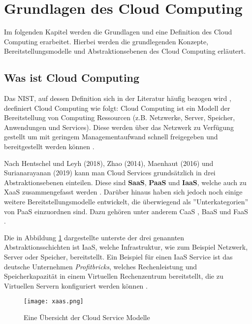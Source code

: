 \section{Grundlagen des Cloud Computing}
\label{sec:cloud-computing}

Im folgenden Kapitel werden die Grundlagen und eine Definition des Cloud Computing erarbeitet. Hierbei werden die grundlegenden Konzepte, Bereitstellungsmodelle und Abstraktionsebenen des Cloud Computing erläutert.

\subsection{Was ist Cloud Computing}
Das \ac{NIST}, auf dessen Definition sich in der Literatur häufig bezogen wird \cite[Vgl.][S. 4f]{Reinheimer2018}, deefiniert Cloud Computing wie folgt: Cloud Computing ist ein Modell der Bereitstellung von Computing Ressourcen (z.B. Netzwerke, Server, Speicher, Anwendungen und Services). Diese werden über das Netzwerk zu Verfügung gestellt um mit geringem Managementaufwand schnell freigegeben und bereitgestellt werden können \cite[Vgl.][S. 2]{Mell2011}\cite[Vgl.][S. 5]{Reinheimer2018}.

Nach Hentschel und Leyh (2018), Zhao (2014), Maenhaut (2016) und Surianarayanan (2019) kann man Cloud Services grundsätzlich in drei Abstraktionsebenen einteilen. Diese sind \textbf{\ac{SaaS}}, \textbf{\ac{PaaS}} und \textbf{\ac{IaaS}}, welche auch zu \ac{XaaS} zusammengefasst werden \cite[Vgl.][S. 9]{Reinheimer2018}\cite[Vgl.][S. 143f]{Zhao2014}\cite[Vgl.][S. 32ff]{Maenhaut2016}\cite[Vgl.][S. 226ff]{Surianarayanan2019}. Darüber hinaus haben sich jedoch noch einige weitere Bereitstellungsmodelle entwickelt, die überwiegend als ''Unterkategorien'' von \ac{PaaS} einzuordnen sind. Dazu gehören unter anderem \ac{CaaS} \cite[Vgl.][]{Luber2019}, \ac{BaaS} und \ac{FaaS} \cite[Vgl.][]{Luber2022}. \pagebreak

Die in Abbildung \ref{fig:XaaS} dargestellte unterste der drei genannten Abstraktionsschichten ist \ac{IaaS}, welche Infrastruktur, wie zum Beispiel Netzwerk, Server oder Speicher, bereitstellt. Ein Beispiel für einen \ac{IaaS} Service ist das deutsche Unternehmen \textit{Profitbricks}, welches Rechenleistung und Speicherkapazität in einem Virtuellen Rechenzentrum bereitstellt, die zu Virtuellen Servern konfiguriert werden können \cite[Vgl.][S. 12]{Reinheimer2018}.

\begin{figure}[H]
    \centering
    \texttt{[image: xaas.png]}
    \caption{Eine Übersicht der Cloud Service Modelle \cite[Eigene Darstellung nach][S. 33]{Maenhaut2016}\cite[Ergänzt durch][]{Toroman2018}}
    \label{fig:XaaS}
\end{figure}

